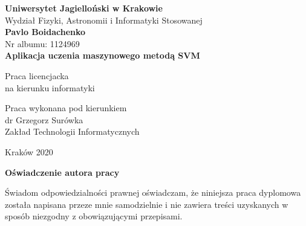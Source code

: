 \documentclass[paper=a4, fontsize=11pt]{scrartcl} %
\def \thesis {Aplikacja uczenia maszynowego metodą SVM}
\def \author {Pavlo Boidachenko}
\def \department {Wydział Fizyki, Astronomii i Informatyki Stosowanej}
\numberwithin{equation}{section} %
\numberwithin{figure}{section} %
\begin{document}
\thispagestyle{empty}
\begin{titlepage}
    \begin{center}
        \Large \textbf{Uniwersytet Jagielloński w Krakowie}\vspace{0.2cm}\\ \department\\
        \vspace*{1cm} 
        \vspace{3cm}
        \Large
        \textbf{\author}\\\vspace{0.5cm}
        \normalsize Nr albumu: 1124969\\
        \vspace{2cm}
        \Huge
        \textbf{\thesis}

        \vspace{1.5cm}
        \normalsize
        Praca licencjacka\\
        na kierunku informatyki\\ \vspace{0.15cm}
        \vfill
        \vspace{2cm}
        \begin{minipage}{1\textwidth}
            \begin{flushright}
                Praca wykonana pod kierunkiem\\
                dr Grzegorz Surówka\\
                Zakład Technologii Informatycznych 
            \end{flushright}
        \end{minipage}
        \vspace{2cm}
        \begin{center}
            Kraków 2020
        \end{center}
    \end{center}

\end{titlepage}

\newpage 
 \thispagestyle{empty}
\vspace{2.5cm}
\begin{flushleft}
\large \textbf{Oświadczenie autora pracy}\vspace{0.6cm}\\
\end{flushleft}

\noindent Świadom odpowiedzialności prawnej oświadczam, że niniejsza praca dyplomowa została napisana przeze mnie samodzielnie i nie zawiera treści uzyskanych w sposób niezgodny z obowiązującymi przepisami.\\
\end{document}
